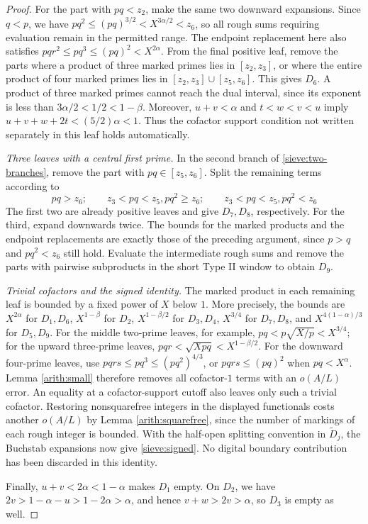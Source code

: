 \documentclass[11pt,a4paper]{article}
\theoremstyle{paperplain}
\numberwithin{equation}{section}
\begin{document}
\begin{proof}
For the part with $pq<z_2$, make the same two downward expansions.
Since $q<p$, we have
$pq^2\le(pq)^{3/2}<X^{3\alpha/2}<z_6$,
so all rough sums requiring evaluation remain in the permitted
range.
The endpoint replacement here also satisfies
$pqr^2\le pq^3\le(pq)^2<X^{2\alpha}$.
From the final positive leaf, remove the parts where a product of
three marked primes lies in $[z_2,z_3]$, or where the entire product
of four marked primes lies in $[z_2,z_3]\cup[z_5,z_6]$.
This gives $D_6$.
A product of three marked primes cannot reach the dual interval,
since its exponent is less than
$3\alpha/2<1/2<1-\beta$.
Moreover, $u+v<\alpha$ and $t<w<v<u$ imply
$u+v+w+2t<(5/2)\alpha<1$.
Thus the cofactor support condition not written separately in this
leaf holds automatically.

\smallskip\noindent\emph{Three leaves with a central first prime.}\quad
In the second branch of \eqref{sieve:two-branches}, remove the part
with $pq\in[z_5,z_6]$. Split the remaining terms according to
\[
 pq>z_6;\qquad z_3<pq<z_5, pq^2\ge z_6;\qquad
 z_3<pq<z_5, pq^2<z_6
\]
The first two are already positive leaves and give $D_7,D_8$,
respectively.
For the third, expand downwards twice.
The bounds for the marked products and the endpoint replacements
are exactly those of the preceding argument, since $p>q$ and
$pq^2<z_6$ still hold.
Evaluate the intermediate rough sums and remove the parts with
pairwise subproducts in the short Type II window to obtain $D_9$.

\smallskip\noindent\emph{Trivial cofactors and the signed identity.}\quad
The marked product in each remaining leaf is bounded by a fixed
power of $X$ below $1$. More precisely, the bounds are
$X^{2\alpha}$ for $D_1,D_6$, $X^{1-\beta}$ for $D_2$,
$X^{1-\beta/2}$ for $D_3,D_4$, $X^{3/4}$ for $D_7,D_8$,
and $X^{4(1-\alpha)/3}$ for $D_5,D_9$.
For the middle two-prime leaves, for example,
$pq<p\sqrt{X/p}<X^{3/4}$; for the upward three-prime leaves,
$pqr<\sqrt{Xpq}<X^{1-\beta/2}$.
For the downward four-prime leaves, use
$pqrs\le pq^3\le(pq^2)^{4/3}$, or
$pqrs\le(pq)^2$ when $pq<X^\alpha$.
Lemma \ref{arith:small} therefore removes all cofactor-$1$ terms
with an $o(A/L)$ error. An equality at a cofactor-support cutoff
also leaves only such a trivial cofactor.
Restoring nonsquarefree integers in the displayed functionals costs
another $o(A/L)$ by Lemma \ref{arith:squarefree}, since the number
of markings of each rough integer is bounded.
With the half-open splitting convention in $\widetilde D_j$, the
Buchstab expansions now give \eqref{sieve:signed}.
No digital boundary contribution has been discarded in this identity.

Finally, $u+v<2\alpha<1-\alpha$ makes $D_1$ empty.
On $D_2$, we have $2v>1-\alpha-u>1-2\alpha>\alpha$, and hence
$v+w>2v>\alpha$, so $D_3$ is empty as well.
\end{proof}
\end{document}
